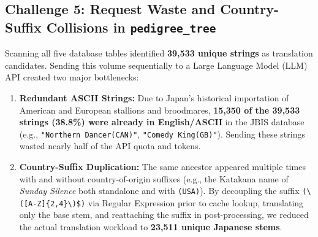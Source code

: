 \documentclass[12pt,a4paper]{article}
\begin{document}
\subsection{Challenge 5: Request Waste and Country-Suffix Collisions in \texttt{pedigree\_tree}}
Scanning all five database tables identified \textbf{39,533 unique strings} as translation candidates. Sending this volume sequentially to a Large Language Model (LLM) API created two major bottlenecks:
\begin{enumerate}
    \item \textbf{Redundant ASCII Strings:} Due to Japan's historical importation of American and European stallions and broodmares, \textbf{15,350 of the 39,533 strings (38.8\%) were already in English/ASCII} in the JBIS database (e.g., \texttt{"Northern Dancer(CAN)"}, \texttt{"Comedy King(GB)"}). Sending these strings wasted nearly half of the API quota and tokens.
    \item \textbf{Country-Suffix Duplication:} The same ancestor appeared multiple times with and without country-of-origin suffixes (e.g., the Katakana name of \textit{Sunday Silence} both standalone and with \texttt{(USA)}). By decoupling the suffix \texttt{(\textbackslash([A-Z]\{2,4\}\textbackslash)\$)} via Regular Expression prior to cache lookup, translating only the base stem, and reattaching the suffix in post-processing, we reduced the actual translation workload to \textbf{23,511 unique Japanese stems}.
\end{enumerate}
\end{document}
